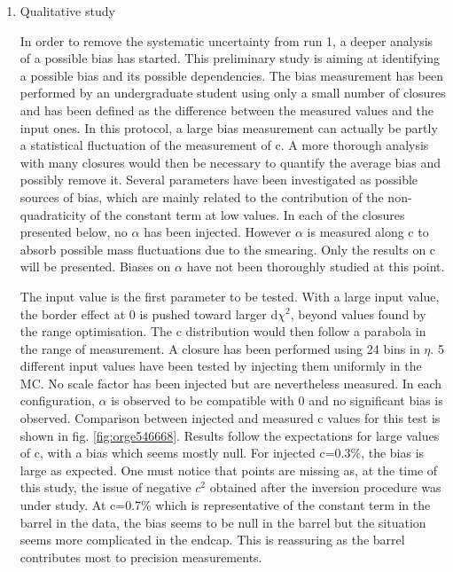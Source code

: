 \begin{enumerate}
\item Qualitative study
\label{sec:orge82a247}

In order to remove the systematic uncertainty from run 1, a deeper analysis of a possible bias has started.
This preliminary study is aiming at identifying a possible bias and its possible dependencies.
The bias measurement has been performed by an undergraduate student \cite{Rode_150507,Rode2015} using only a small number of closures and has been defined as the difference between the measured values and the input ones.
In this protocol, a large bias measurement can actually be partly a statistical fluctuation of the measurement of c.
A more thorough analysis with many closures would then be necessary to quantify the average bias and possibly remove it.
Several parameters have been investigated as possible sources of bias, which are mainly related to the contribution of the non-quadraticity of the constant term at low values.
In each of the closures presented below, no $\alpha$ has been injected.
However $\alpha$ is measured along c to absorb possible mass fluctuations due to the smearing.
Only the results on c will be presented.
Biases on $\alpha$ have not been thoroughly studied at this point.

The input value is the first parameter to be tested.
With a large input value, the border effect at 0 is pushed toward larger d$\chi^2$, beyond values found by the range optimisation.
The c distribution would then follow a parabola in the range of measurement.
A closure has been performed using 24 bins in $\eta$.
5 different input values have been tested by injecting them uniformly in the MC.
No scale factor has been injected but are nevertheless measured.
In each configuration, $\alpha$ is observed to be compatible with 0 and no significant bias is observed.
Comparison between injected and measured c values for this test is shown in fig. \ref{fig:orge546668}.
Results follow the expectations for large values of c, with a bias which seems mostly null.
For injected c=0.3\%, the bias is large as expected.
One must notice that points are missing as, at the time of this study, the issue of negative $c^2$ obtained after the inversion procedure was under study.
At c=0.7\% which is representative of the constant term in the barrel in the data, the bias seems to be null in the barrel but the situation seems more complicated in the endcap.
This is reassuring as the barrel contributes most to precision measurements.


\end{enumerate}
